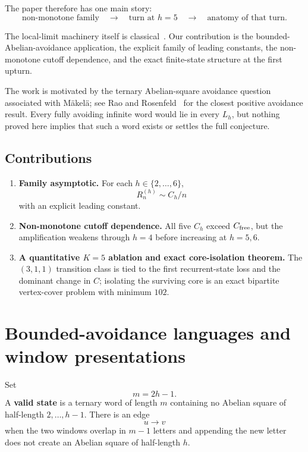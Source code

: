 \documentclass[12pt]{article}
\theoremstyle{definition}
\begin{document}
The paper therefore has one main story:
\[
\text{non-monotone family}
\quad\longrightarrow\quad
\text{turn at }h=5
\quad\longrightarrow\quad
\text{anatomy of that turn}.
\]

The local-limit machinery itself is classical~\cite{Bertoni2003,Goldwurm2023,Herve2010}. Our contribution is the bounded-Abelian-avoidance application, the explicit family of leading constants, the non-monotone cutoff dependence, and the exact finite-state structure at the first upturn.

The work is motivated by the ternary Abelian-square avoidance question associated with M\"akel\"a; see Rao and Rosenfeld~\cite{Rao2018} for the closest positive avoidance result. Every fully avoiding infinite word would lie in every \(L_h\), but nothing proved here implies that such a word exists or settles the full conjecture.

\subsection*{Contributions}

\begin{enumerate}
\item \textbf{Family asymptotic.} For each \(h\in\{2,\ldots,6\}\),
\[
R_n^{(h)}\sim C_h/n
\]
with an explicit leading constant.
\item \textbf{Non-monotone cutoff dependence.} All five \(C_h\) exceed \(C_{\rm free}\), but the amplification weakens through \(h=4\) before increasing at \(h=5,6\).
\item \textbf{A quantitative \(K=5\) ablation and exact core-isolation theorem.} The \((3,1,1)\) transition class is tied to the first recurrent-state loss and the dominant change in \(C\); isolating the surviving core is an exact bipartite vertex-cover problem with minimum \(102\).
\end{enumerate}

\section{Bounded-avoidance languages and window presentations}
\label{sec:windows}

Set
\[
m=2h-1.
\]
A \textbf{valid state} is a ternary word of length \(m\) containing no Abelian square of half-length \(2,\ldots,h-1\). There is an edge
\[
u\longrightarrow v
\]
when the two windows overlap in \(m-1\) letters and appending the new letter does not create an Abelian square of half-length \(h\).
\end{document}
